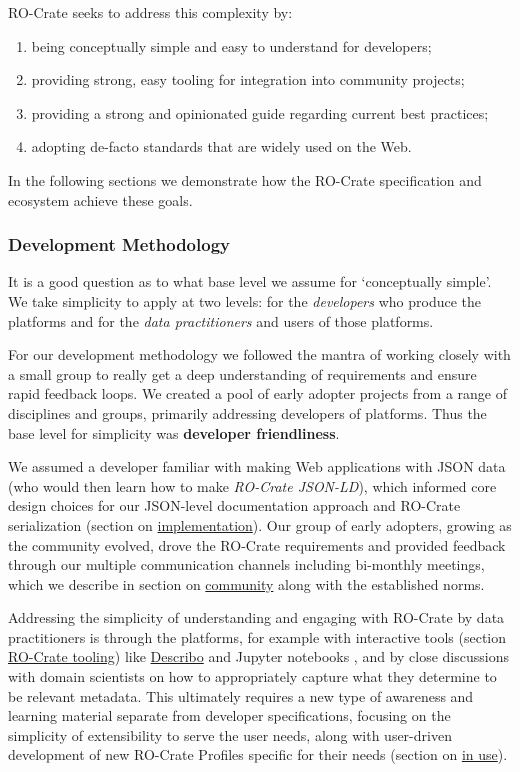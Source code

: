 {RO-Crate seeks to address this complexity by:

\begin{enumerate}
\def\labelenumi{\arabic{enumi}.}
\tightlist
\item
  being conceptually simple and easy to understand for developers;
\item
  providing strong, easy tooling for integration into community
  projects;
\item
  providing a strong and opinionated guide regarding current best
  practices;
\item
  adopting de-facto standards that are widely used on the Web.
\end{enumerate}

In the following sections we demonstrate how the RO-Crate specification
and ecosystem achieve these goals.

\hypertarget{methodology}{%
\subsubsection{Development Methodology}\label{methodology}}

It is a good question as to what base level we assume for `conceptually
simple'. We take simplicity to apply at two levels: for the
\emph{developers} who produce the platforms and for the \emph{data
practitioners} and users of those platforms.

For our development methodology we followed the mantra of working
closely with a small group to really get a deep understanding of
requirements and ensure rapid feedback loops. We created a pool of early
adopter projects from a range of disciplines and groups, primarily
addressing developers of platforms. Thus the base level for simplicity
was \textbf{developer friendliness}.

We assumed a developer familiar with making Web applications with JSON
data (who would then learn how to make \emph{RO-Crate JSON-LD}), which
informed core design choices for our JSON-level documentation approach
and RO-Crate serialization (section on
\protect\hyperlink{implementation}{implementation}). Our group of early
adopters, growing as the community evolved, drove the RO-Crate
requirements and provided feedback through our multiple communication
channels including bi-monthly meetings, which we describe in section on
\protect\hyperlink{community}{community} along with the established
norms.

Addressing the simplicity of understanding and engaging with RO-Crate by
data practitioners is through the platforms, for example with
interactive tools (section \protect\hyperlink{tooling}{RO-Crate
tooling}) like
\href{https://arkisto-platform.github.io/describo/}{Describo} \cite{ch5-78} and
Jupyter notebooks
\cite{ch5-70}, and by
close discussions with domain scientists on how to appropriately capture
what they determine to be relevant metadata. This ultimately requires a
new type of awareness and learning material separate from developer
specifications, focusing on the simplicity of extensibility to serve the
user needs, along with user-driven development of new RO-Crate Profiles
specific for their needs (section on \protect\hyperlink{inuse}{in use}).

}
